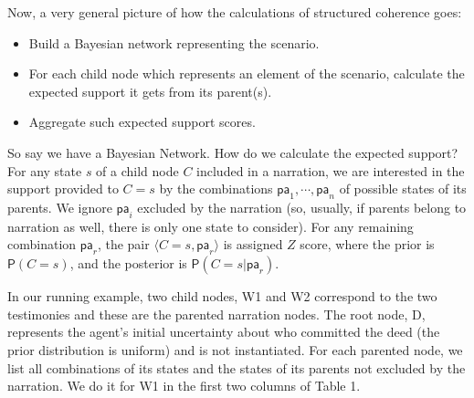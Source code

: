 \documentclass[10pt,]{scrartcl}
\newcommand{\ra}{\rangle}
\newcommand{\la}{\langle}
\newcommand{\pr}{\mathsf{P}}
\begin{document}
Now, a very general picture of how the calculations of structured coherence  goes:

\begin{itemize}
    \item Build a Bayesian network representing the scenario.
    \item For each child node which represents an element of the scenario, calculate the expected support it gets from its parent(s). 
    \item Aggregate such expected support scores.
\end{itemize}


So say we have a Bayesian Network. How do we calculate the expected support? For any state \(s\) of
a child node \(C\) included in a narration, we are interested in the
support provided to \(C=s\) by the combinations
\(\mathsf{pa}_1, \cdots, \mathsf{pa}_n\) of possible states of its
parents. We ignore \(\mathsf{pa}_i\) excluded by the narration (so, usually, if parents belong to narration as well, there is only one state to consider). For any
remaining combination \(\mathsf{pa}_r\), the pair
\(\la C=s, \mathsf{pa}_r\ra\) is assigned  $Z$ score, where the prior is $\pr(C=s)$, and the posterior is $\pr(C=s \vert \mathsf{pa}_r)$.

In our running example, two child nodes, \textsf{W1} and
\textsf{W2} correspond to the two testimonies and these are the parented narration nodes.
 The root node, \textsf{D},
 represents the agent's initial uncertainty about who
committed the deed (the prior distribution is uniform) and is not
instantiated. 
For each parented node,  we list all combinations  of its states and the states of its parents not excluded by the narration. We do it for \textsf{W1} in the first two columns of Table 1.
\end{document}
